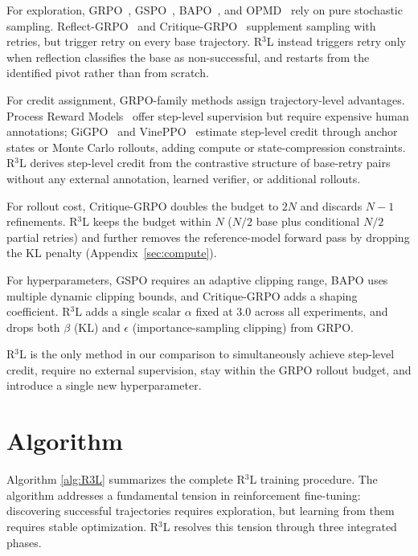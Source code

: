 \documentclass{article} %
\theoremstyle{definition}
\theoremstyle{remark}
\let\cite\citep
\begin{document}
For exploration, GRPO~\cite{shao2024deepseekmath}, GSPO~\cite{zheng2025group}, BAPO~\cite{xi2025bapo}, and OPMD~\cite{yao2025group} rely on pure stochastic sampling. Reflect-GRPO~\cite{bensal2025reflect} and Critique-GRPO~\cite{zhang2025critique} supplement sampling with retries, but trigger retry on every base trajectory. R$^3$L instead triggers retry only when reflection classifies the base as non-successful, and restarts from the identified pivot rather than from scratch.

For credit assignment, GRPO-family methods assign trajectory-level advantages. Process Reward Models~\cite{wang2024math,lightman2023let} offer step-level supervision but require expensive human annotations; GiGPO~\cite{feng2025group} and VinePPO~\cite{kazemnejad2024vineppo} estimate step-level credit through anchor states or Monte Carlo rollouts, adding compute or state-compression constraints. R$^3$L derives step-level credit from the contrastive structure of base-retry pairs without any external annotation, learned verifier, or additional rollouts.

For rollout cost, Critique-GRPO doubles the budget to $2N$ and discards $N{-}1$ refinements. R$^3$L keeps the budget within $N$ ($N/2$ base plus conditional $N/2$ partial retries) and further removes the reference-model forward pass by dropping the KL penalty (Appendix~\ref{sec:compute}).

For hyperparameters, GSPO requires an adaptive clipping range, BAPO uses multiple dynamic clipping bounds, and Critique-GRPO adds a shaping coefficient. R$^3$L adds a single scalar $\alpha$ fixed at $3.0$ across all experiments, and drops both $\beta$ (KL) and $\epsilon$ (importance-sampling clipping) from GRPO.

R$^3$L is the only method in our comparison to simultaneously achieve step-level credit, require no external supervision, stay within the GRPO rollout budget, and introduce a single new hyperparameter.

\section{Algorithm}
\label{sec:algorithm}

Algorithm \ref{alg:R3L} summarizes the complete R$^3$L training procedure. The algorithm addresses a fundamental tension in reinforcement fine-tuning: discovering successful trajectories requires exploration, but learning from them requires stable optimization. R$^3$L resolves this tension through three integrated phases.
\end{document}
